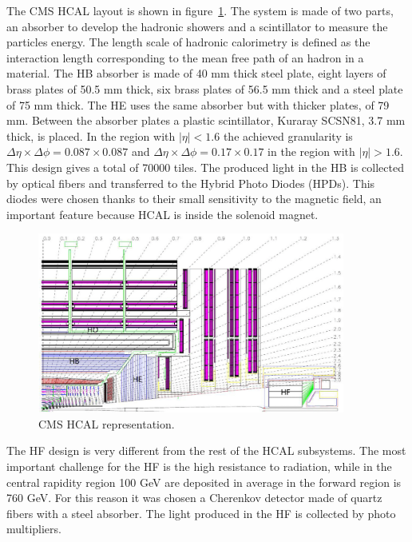 The CMS HCAL layout is shown in figure~\ref{fig:hcal}. The system is made of two parts, an absorber to develop the hadronic showers and a scintillator to measure the particles energy. The length scale of hadronic calorimetry is defined as the interaction length corresponding to the mean free path of an hadron in a material. The HB absorber is made of 40 mm thick steel plate, eight layers of brass plates of 50.5 mm thick, six brass plates of 56.5 mm thick and a steel plate of 75 mm thick. The HE uses the same absorber but with thicker plates, of 79 mm. Between the absorber plates a plastic scintillator, Kuraray SCSN81, 3.7 mm thick, is placed. In the region with $|\eta|<1.6$ the achieved granularity is $\Delta\eta\times\Delta\phi=0.087\times 0.087$ and $\Delta\eta\times\Delta\phi=0.17\times 0.17$ in the region with $|\eta|>1.6$. This design gives a total of 70000 tiles. The produced light in the HB is collected by optical fibers and transferred to the Hybrid Photo Diodes (HPDs). This diodes were chosen thanks to their small sensitivity to the magnetic field, an important feature because HCAL is inside the solenoid magnet. %

\begin{figure}[!Hhtbp]
  \begin{center}
    \includegraphics[width=0.9\textwidth]{figs/HCAL.png}
    \caption{CMS HCAL representation. }
    \label{fig:hcal}
  \end{center}
\end{figure}

The HF design is very different from the rest of the HCAL subsystems. The most important challenge for the HF is the high resistance to radiation, while in the central rapidity region 100 GeV are deposited in average in the forward region is 760 GeV. For this reason it was chosen a Cherenkov detector made of quartz fibers with a steel absorber. The light produced in the HF is collected by photo multipliers. 

